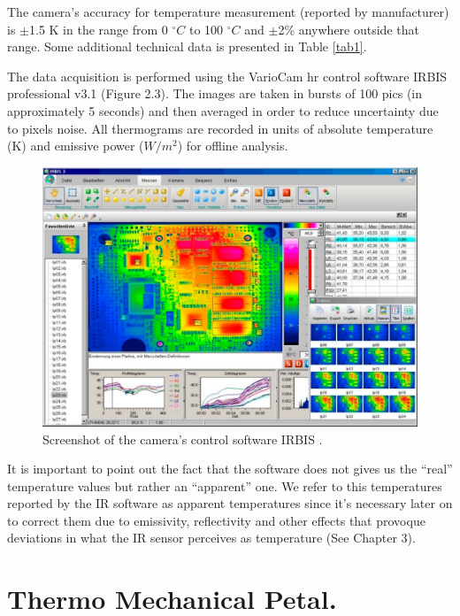 		The camera's accuracy for temperature measurement (reported by manufacturer) is $\pm$1.5 K in the range from 0 $^{\circ}C$ to 100 $^{\circ}C$ and $\pm$2\% anywhere outside that range. Some additional technical data is presented in Table \ref{tab1}.
		
		The data acquisition is performed using the VarioCam hr control software IRBIS \textregistered professional v3.1 (Figure 2.3). The images are taken in bursts of 100 pics (in approximately 5 seconds) and then averaged in order to reduce uncertainty due to pixels noise. All thermograms are recorded in units of absolute temperature (K) and emissive power ($W/m^2$) for offline analysis.
		
		\begin{figure}[ht!]
			\centering
			\captionsetup{justification=centering,margin=2cm}
			\includegraphics[scale=0.35]{Figures/Chapter02/IRBISimage.pdf}
			\caption{\label{fig7} Screenshot of the camera’s control software IRBIS .}
		\end{figure}

		It is important to point out the fact that the software does not gives us the “real” temperature values but rather an “apparent” one. We refer to this temperatures reported by the IR software as apparent temperatures since it's necessary later on to correct them due to emissivity, reflectivity and other effects that provoque deviations in what the IR sensor perceives as temperature (See Chapter 3).
		
	\section{Thermo Mechanical Petal.}
	
